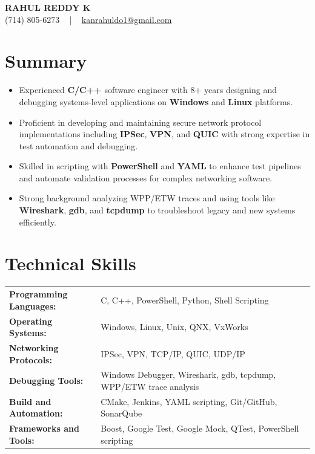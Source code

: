 \documentclass[letterpaper,11pt]{article}
\newcommand{\resumeItem}[1]{
  \item\footnotesize{
    {#1 \vspace{-2pt}}
  }
}
\newcommand{\resumeItemListStart}{\begin{itemize}[leftmargin=*]}
\newcommand{\resumeItemListEnd}{\end{itemize}\vspace{-5pt}}
\begin{document}
\begin{center}
    {\fontsize{14pt}{12pt}\selectfont \textbf{\MakeUppercase{Rahul Reddy K}}}\\ \vspace{2pt}
    \fontsize{10pt}{12pt}\selectfont (714) 805-6273 ~ | ~ \href{mailto:kanrahuldo1@gmail.com}{kanrahuldo1@gmail.com}~
    \vspace{-8pt}
\end{center}

\section{Summary}
\fontsize{9pt}{10pt}\selectfont
\resumeItemListStart
    \resumeItem{Experienced \textbf{C/C++} software engineer with 8+ years designing and debugging systems-level applications on \textbf{Windows} and \textbf{Linux} platforms.}
    \resumeItem{Proficient in developing and maintaining secure network protocol implementations including \textbf{IPSec}, \textbf{VPN}, and \textbf{QUIC} with strong expertise in test automation and debugging.}
    \resumeItem{Skilled in scripting with \textbf{PowerShell} and \textbf{YAML} to enhance test pipelines and automate validation processes for complex networking software.}
    \resumeItem{Strong background analyzing WPP/ETW traces and using tools like \textbf{Wireshark}, \textbf{gdb}, and \textbf{tcpdump} to troubleshoot legacy and new systems efficiently.}
\resumeItemListEnd
\vspace{-6pt}

\section{Technical Skills}
        \vspace{-14pt}
        \begin{table}[h]
            \fontsize{9pt}{10pt}\selectfont
            \begin{tabular}{p{0.3\linewidth} p{0.7\linewidth}}
                \textbf{Programming Languages:} & C, C++, PowerShell, Python, Shell Scripting \\
                \textbf{Operating Systems:} & Windows, Linux, Unix, QNX, VxWorks \\
                \textbf{Networking Protocols:} & IPSec, VPN, TCP/IP, QUIC, UDP/IP \\
                \textbf{Debugging Tools:} & Windows Debugger, Wireshark, gdb, tcpdump, WPP/ETW trace analysis \\
                \textbf{Build and Automation:} & CMake, Jenkins, YAML scripting, Git/GitHub, SonarQube \\
                \textbf{Frameworks and Tools:} & Boost, Google Test, Google Mock, QTest, PowerShell scripting \\
            \end{tabular}
        \end{table}
    \vspace{-15pt}
\end{document}
